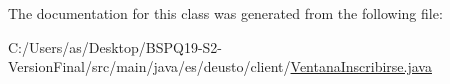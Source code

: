 The documentation for this class was generated from the following file\+:\begin{DoxyCompactItemize}
\item 
C\+:/\+Users/as/\+Desktop/\+B\+S\+P\+Q19-\/\+S2-\/\+Version\+Final/src/main/java/es/deusto/client/\mbox{\hyperlink{_ventana_inscribirse_8java}{Ventana\+Inscribirse.\+java}}\end{DoxyCompactItemize}
